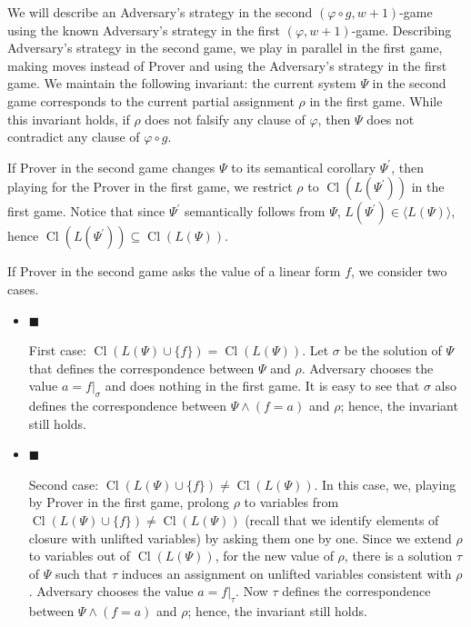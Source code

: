 We will describe an Adversary’s strategy in the second $(\varphi\circ g,w+1)$-game using the known Adversary’s strategy in the first $(\varphi,w+1)$-game. Describing Adversary’s strategy in the second game, we play in parallel in the first game, making moves instead of Prover and using the Adversary’s strategy in the first game. We maintain the following invariant: the current system $\Psi$ in the second game corresponds to the current partial assignment $\rho$ in the first game. While this invariant holds, if $\rho$ does not falsify any clause of $\varphi$, then $\Psi$ does not contradict any clause of $\varphi\circ g$.\par



If Prover in the second game changes $\Psi$ to its semantical corollary $\Psi^{\prime}$, then playing for the Prover in the first game, we restrict $\rho$ to $\mathop{\mathrm{Cl}}(L(\Psi^{\prime}))$ in the first game. Notice that since $\Psi^{\prime}$ semantically follows from $\Psi$, $L(\Psi^{\prime})\in\langle L(\Psi)\rangle$, hence $\mathop{\mathrm{Cl}}(L(\Psi^{\prime}))\subseteq\mathop{\mathrm{Cl}}(L(\Psi))$.\par



If Prover in the second game asks the value of a linear form $f$, we consider two cases.\par


\begin{itemize}


\item 
$\blacksquare$ 


First case: $\mathop{\mathrm{Cl}}(L(\Psi)\cup\{f\})=\mathop{\mathrm{Cl}}(L(\Psi))$. Let $\sigma$ be the solution of $\Psi$ that defines the correspondence between $\Psi$ and $\rho$. Adversary chooses the value $a=f|_{\sigma}$ and does nothing in the first game. It is easy to see that $\sigma$ also defines the correspondence between $\Psi\land(f=a)$ and $\rho$; hence, the invariant still holds.\par





\item 
$\blacksquare$ 


Second case: $\mathop{\mathrm{Cl}}(L(\Psi)\cup\{f\})\neq\mathop{\mathrm{Cl}}(L(\Psi))$. In this case, we, playing by Prover in the first game, prolong $\rho$ to variables from $\mathop{\mathrm{Cl}}(L(\Psi)\cup\{f\})\neq\mathop{\mathrm{Cl}}(L(\Psi))$ (recall that we identify elements of closure with unlifted variables) by asking them one by one. Since we extend $\rho$ to variables out of $\mathop{\mathrm{Cl}}(L(\Psi))$, for the new value of $\rho$, there is a solution $\tau$ of $\Psi$ such that $\tau$ induces an assignment on unlifted variables consistent with $\rho$. Adversary chooses the value $a=f|_{\tau}$. Now $\tau$ defines the correspondence between $\Psi\land(f=a)$ and $\rho$; hence, the invariant still holds.\par





\end{itemize}



